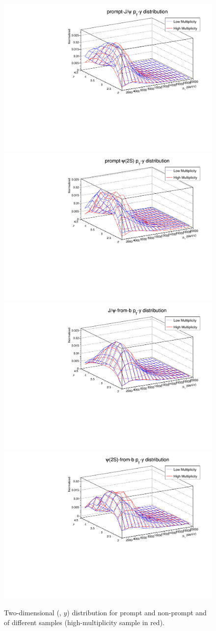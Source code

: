 \begin{figure}[h]
  \begin{center}
    \includegraphics[width=0.49\linewidth]{pdf/Jpsi/reweight/promptHighLowPTY.pdf}
    \includegraphics[width=0.49\linewidth]{pdf/Psi2S/reweight/promptHighLowPTY.pdf}
    \vspace*{-0.5cm}
    \includegraphics[width=0.49\linewidth]{pdf/Jpsi/reweight/frombHighLowPTY.pdf}
    \includegraphics[width=0.49\linewidth]{pdf/Psi2S/reweight/frombHighLowPTY.pdf}
  \end{center}
  \caption{
    Two-dimensional (\pt, $y$) distribution for prompt and non-prompt \jpsi and \psitwos of different samples (high-multiplicity sample in red).}
  \label{HighLowDist}
\end{figure}

